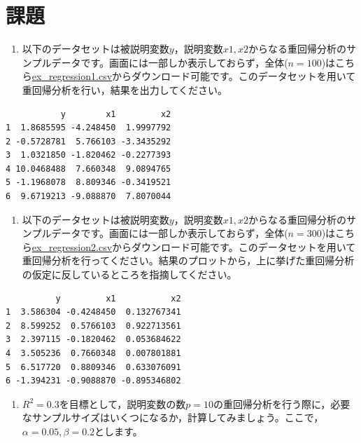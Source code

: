 \documentclass[
  a4paper,
]{ltjsbook}
\providecommand{\tightlist}{%
  \setlength{\itemsep}{0pt}\setlength{\parskip}{0pt}}
\begin{document}
\section{課題}\label{ux8ab2ux984c-9}

\begin{enumerate}
\def\labelenumi{\arabic{enumi}.}
\tightlist
\item
  以下のデータセットは被説明変数\(y\)，説明変数\(x1,x2\)からなる重回帰分析のサンプルデータです。画面には一部しか表示しておらず，全体(\(n=100\))はこちら\url{ex_regression1.csv}からダウンロード可能です。このデータセットを用いて重回帰分析を行い，結果を出力してください。
\end{enumerate}

\begin{verbatim}
           y        x1         x2
1  1.8685595 -4.248450  1.9997792
2 -0.5728781  5.766103 -3.3435292
3  1.0321850 -1.820462 -0.2277393
4 10.0468488  7.660348  9.0894765
5 -1.1968078  8.809346 -0.3419521
6  9.6719213 -9.088870  7.8070044
\end{verbatim}

\begin{enumerate}
\def\labelenumi{\arabic{enumi}.}
\setcounter{enumi}{1}
\tightlist
\item
  以下のデータセットは被説明変数\(y\)，説明変数\(x1,x2\)からなる重回帰分析のサンプルデータです。画面には一部しか表示しておらず，全体(\(n=300\))はこちら\url{ex_regression2.csv}からダウンロード可能です。このデータセットを用いて重回帰分析を行ってください。結果のプロットから，上に挙げた重回帰分析の仮定に反しているところを指摘してください。
\end{enumerate}

\begin{verbatim}
          y         x1           x2
1  3.586304 -0.4248450  0.132767341
2  8.599252  0.5766103  0.922713561
3  2.397115 -0.1820462  0.053684622
4  3.505236  0.7660348  0.007801881
5  6.517720  0.8809346  0.633076091
6 -1.394231 -0.9088870 -0.895346802
\end{verbatim}

\begin{enumerate}
\def\labelenumi{\arabic{enumi}.}
\setcounter{enumi}{2}
\tightlist
\item
  \(R^2=0.3\)を目標として，説明変数の数\(p=10\)の重回帰分析を行う際に，必要なサンプルサイズはいくつになるか，計算してみましょう。ここで，\(\alpha = 0.05,\beta=0.2\)とします。
\end{enumerate}

\end{document}
